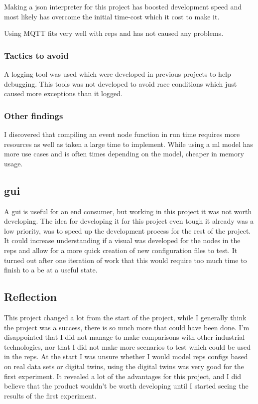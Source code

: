 \documentclass[a4paper,8pt]{article}
\begin{document}
		Making a \gls{json} interpreter for this project has boosted development speed and most likely has overcome the initial time-cost which it cost to make it.
		
		Using MQTT fits very well with \gls{reps} and has not caused any problems.
	
	\subsubsection{Tactics to avoid}	
		A logging tool was used which were developed in previous projects to help debugging. This tools was not developed to avoid race conditions which just caused more exceptions than it logged.
	
	\subsubsection{Other findings}
		I discovered that compiling an event node function in run time requires more resources as well as taken a large time to implement. While using a \gls{ml} model has more use cases and is often times depending on the model, cheaper in memory usage.
	
	\subsection{\gls{gui}}
		A \gls{gui} is useful for an end consumer, but working in this project it was not worth developing. The idea for developing it for this project even tough it already was a low priority, was to speed up the development process for the rest of the project. It could increase understanding if a visual was developed for the nodes in the \gls{reps} and allow for a more quick creation of new configuration files to test. It turned out after one iteration of work that this would require too much time to finish to a be at a useful state.
	
	\subsection{Reflection}
		This project changed a lot from the start of the project, while I generally think the project was a success, there is so much more that could have been done. I'm disappointed that I did not manage to make comparisons with other industrial technologies, nor that I did not make more scenarios to test which could be used in the \gls{reps}. At the start I was unsure whether I would model \gls{reps} configs based on real data sets or digital twins, using the digital twins was very good for the first experiment. It revealed a lot of the advantages for this project, and I did believe that the product wouldn't be worth developing until I started seeing the results of the first experiment.
		
\end{document}
